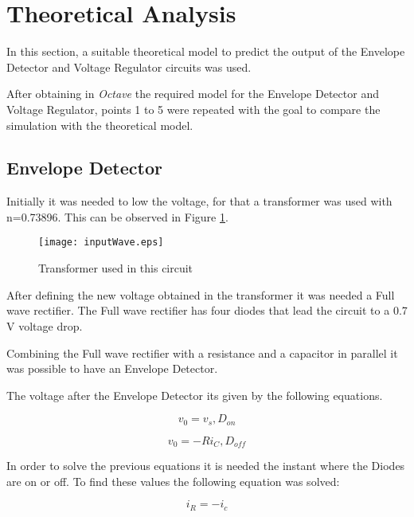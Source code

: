 \newpage
\section{Theoretical Analysis}
\label{sec:analysis}

In this section, a suitable theoretical model to predict the output of the Envelope Detector and Voltage Regulator circuits was used.


After obtaining in \textit{Octave} the required model for the Envelope Detector and Voltage Regulator, points 1 to 5 were repeated with the goal to compare the simulation with the theoretical model.

\subsection{Envelope Detector}

Initially it was needed to low the voltage, for that a transformer was used with n=0.73896. This can be observed in Figure \ref{fig:inputWave}.  

\begin{figure}[h] \centering
\texttt{[image: inputWave.eps]}
\caption{Transformer used in this circuit}
\label{fig:inputWave}
\end{figure}

\newpage

After defining the new voltage obtained in the transformer it was needed a Full wave rectifier. The Full wave rectifier has four diodes that lead the circuit to a 0.7 V voltage drop.

Combining the Full wave rectifier with a resistance and a capacitor in parallel it was possible to have an Envelope Detector. 

The voltage after the Envelope Detector its given by the following equations. 

\begin{equation}
    v_{0}= v_s ,  D_{on}
\end{equation} 

\begin{equation}
    v_{0}= - Ri_C ,   D_{off}
\end{equation} 


In order to solve the previous equations it is needed the instant where the Diodes are on or off. To find these values the following equation was solved:

\begin{equation}
    i_R= - i_c 
\end{equation}

